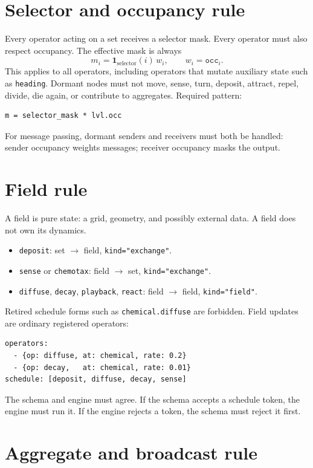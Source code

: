 \documentclass[11pt]{article}
\newcommand{\code}[1]{\texttt{#1}}
\begin{document}
\section{Selector and occupancy rule}

Every operator acting on a set receives a selector mask. Every operator must also
respect occupancy. The effective mask is always
\[
m_i = \mathbf{1}_{\mathrm{selector}}(i)\, w_i, \qquad w_i = \texttt{occ}_i .
\]
This applies to all operators, including operators that mutate auxiliary state such
as \code{heading}. Dormant nodes must not move, sense, turn, deposit, attract,
repel, divide, die again, or contribute to aggregates. Required pattern:
\begin{lstlisting}[style=yaml]
m = selector_mask * lvl.occ
\end{lstlisting}
For message passing, dormant senders and receivers must both be handled: sender
occupancy weights messages; receiver occupancy masks the output.

\section{Field rule}

A field is pure state: a grid, geometry, and possibly external data. A field does
not own its dynamics.
\begin{itemize}\itemsep2pt
\item \code{deposit}: set $\to$ field, \code{kind="exchange"}.
\item \code{sense} or \code{chemotax}: field $\to$ set, \code{kind="exchange"}.
\item \code{diffuse}, \code{decay}, \code{playback}, \code{react}: field $\to$ field,
\code{kind="field"}.
\end{itemize}
Retired schedule forms such as \code{chemical.diffuse} are forbidden. Field updates
are ordinary registered operators:
\begin{lstlisting}[style=yaml]
operators:
  - {op: diffuse, at: chemical, rate: 0.2}
  - {op: decay,   at: chemical, rate: 0.01}
schedule: [deposit, diffuse, decay, sense]
\end{lstlisting}
The schema and engine must agree. If the schema accepts a schedule token, the
engine must run it. If the engine rejects a token, the schema must reject it first.

\section{Aggregate and broadcast rule}
\end{document}
